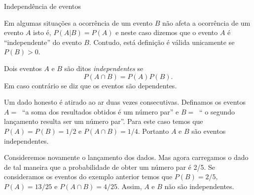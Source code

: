 %

\begin{frame}{Independência de eventos}

Em algumas situações a ocorrência de um evento $B$ não afeta a ocorrência de um evento $A$ isto é, $P(A|B) = P(A)$ e neste caso dizemos que o evento $A$ é ``independente'' do evento $B.$ Contudo, está definição é válida unicamente se $P(B)>0.$ %


\begin{defi}
Dois eventos $A$ e $B$ são ditos \textit{independentes} se 
$$P(A\cap B)=P(A)P(B).$$ Em caso contrário se diz que os eventos são dependentes.
\end{defi}


\begin{exem}
Um dado honesto é atirado ao ar duas vezes consecutivas.  Definamos os eventos $A= \ $ ``a soma dos resultados obtidos é um número par'' e $B= \ $ `` o segundo lançamento resulta ser um n\'{u}mero par''. Para este caso temos que $P(A)=P(B)=1/2$ e $P(A\cap B)=1/4$. Portanto $A$ e $B$ são eventos independentes. 
\end{exem}

\begin{exem}
Consideremos novamente o lançamento dos dados. Mas agora carregamos o dado de tal maneira que a probabilidade de obter um n\'{u}mero par é 2/5. Se consideramos os eventos do exemplo anterior temos que $P(B)=2/5,$   $P(A)=13/25$ e $P(A\cap B)=4/25$.  Assim, $A$ e $B$ não são independentes.
\end{exem}
 
\end{frame}


